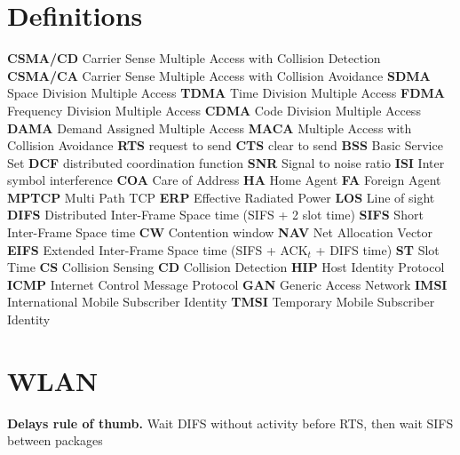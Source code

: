 \documentclass[10pt,twocolumn]{article}
\renewcommand{\bf}{\textbf}
\newcommand{\define}[2]{{\large \textbf{#1}} #2}
\begin{document}
\setlength{\abovedisplayskip}{.3em}
\setlength{\belowdisplayskip}{.3em}

\section{Definitions}

\define{CSMA/CD}{Carrier Sense Multiple Access with Collision Detection}
\define{CSMA/CA}{Carrier Sense Multiple Access with Collision Avoidance}
\define{SDMA}{Space Division Multiple Access}
\define{TDMA}{Time Division Multiple Access}
\define{FDMA}{Frequency Division Multiple Access}
\define{CDMA}{Code Division Multiple Access}
\define{DAMA}{Demand Assigned Multiple Access}
\define{MACA}{Multiple Access with Collision Avoidance}
\define{RTS}{request to send}
\define{CTS}{clear to send}
\define{BSS}{Basic Service Set}
\define{DCF}{distributed coordination function}
\define{SNR}{Signal to noise ratio}
\define{ISI}{Inter symbol interference}
\define{COA}{Care of Address}
\define{HA}{Home Agent}
\define{FA}{Foreign Agent}
\define{MPTCP}{Multi Path TCP}
\define{ERP}{Effective Radiated Power}
\define{LOS}{Line of sight}
\define{DIFS}{Distributed Inter-Frame Space time (SIFS + 2 slot time)}
\define{SIFS}{Short Inter-Frame Space time}
\define{CW}{Contention window}
\define{NAV}{Net Allocation Vector}
\define{EIFS}{Extended Inter-Frame Space time (SIFS + ACK$_{t}$ + DIFS time)}
\define{ST}{Slot Time}
\define{CS}{Collision Sensing}
\define{CD}{Collision Detection}
\define{HIP}{Host Identity Protocol}
\define{ICMP}{Internet Control Message Protocol}
\define{GAN}{Generic Access Network}
\define{IMSI}{International Mobile Subscriber Identity}
\define{TMSI}{Temporary Mobile Subscriber Identity}


\section{WLAN}

\bf{Delays rule of thumb.} Wait DIFS without activity before RTS, then wait SIFS between packages
\end{document}
